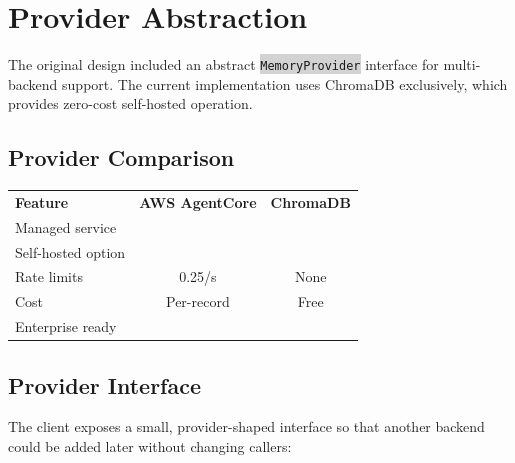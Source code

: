 \documentclass[11pt,letterpaper]{article}
\renewcommand{\arraystretch}{1.4}
\newcommand{\faCheckCircle}{\ding{51}}
\newcommand{\faTimesCircle}{\ding{55}}
\newcommand{\faExclamationCircle}{\ding{74}}
\newcommand{\code}[1]{\texttt{\small\colorbox{lightgray}{#1}}}
\begin{document}
\section{Provider Abstraction}

\begin{tldrbox}
The original design included an abstract \code{MemoryProvider} interface for multi-backend support. The current implementation uses ChromaDB exclusively, which provides zero-cost self-hosted operation.
\end{tldrbox}

\subsection{Provider Comparison}

\begin{center}
\renewcommand{\arraystretch}{1.6}
\begin{tabular}{L{3.5cm} c c}
\textbf{\color{white}Feature} & \textbf{\color{white}AWS AgentCore} & \textbf{\color{white}ChromaDB} \\
Managed service & \textcolor{successgreen}{\faCheckCircle} & \textcolor{coolgray}{\faTimesCircle} \\
Self-hosted option & \textcolor{coolgray}{\faTimesCircle} & \textcolor{successgreen}{\faCheckCircle} \\
Rate limits & \textcolor{dangerred}{0.25/s} & \textcolor{successgreen}{None} \\
Cost & Per-record & Free \\
Enterprise ready & \textcolor{successgreen}{\faCheckCircle} & \textcolor{warningamber}{\faExclamationCircle} \\
\bottomrule
\end{tabular}
\end{center}

\subsection{Provider Interface}

The client exposes a small, provider-shaped interface so that another backend could be added later without changing callers:
\end{document}
